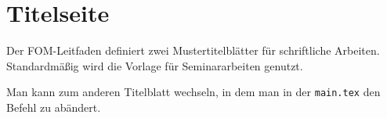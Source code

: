
\chapter{Titelseite}

Der FOM-Leitfaden definiert zwei Mustertitelblätter für schriftliche Arbeiten.  Standardmäßig wird die Vorlage für Seminararbeiten genutzt.

Man kann zum anderen Titelblatt wechseln, in dem man in der \texttt{main.tex} den Befehl \verb|| zu \verb|| abändert.

